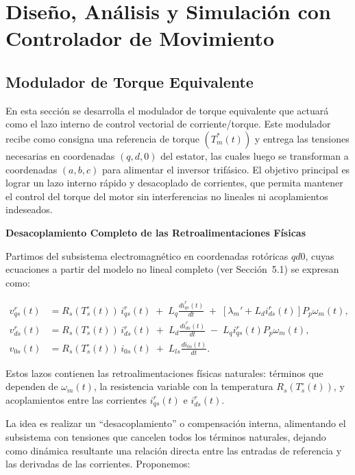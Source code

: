 \documentclass{article}
\begin{document}
\section{Diseño, Análisis y Simulación con Controlador de Movimiento}

\subsection{Modulador de Torque Equivalente}

En esta sección se desarrolla el modulador de torque equivalente que actuará como el lazo interno de control vectorial de corriente/torque. Este modulador recibe como consigna una referencia de torque \((T_m^*(t))\) y entrega las tensiones necesarias en coordenadas \((q,d,0)\) del estator, las cuales luego se transforman a coordenadas \((a,b,c)\) para alimentar el inversor trifásico. El objetivo principal es lograr un lazo interno rápido y desacoplado de corrientes, que permita mantener el control del torque del motor sin interferencias no lineales ni acoplamientos indeseados.

\textbf{Desacoplamiento Completo de las Retroalimentaciones Físicas}

Partimos del subsistema electromagnético en coordenadas rotóricas \( qd0 \), cuyas ecuaciones a partir del modelo no lineal completo (ver Sección~5.1) se expresan como:

\begin{equation}
\begin{aligned}
    v_{qs}^r(t) &= R_s(T_s^\circ(t))\,i_{qs}^r(t) \;+\; L_q \frac{d i_{qs}^r(t)}{dt} \;+\; [\lambda_m' + L_d i_{ds}^r(t)] P_p \omega_m(t),\\[6pt]
    v_{ds}^r(t) &= R_s(T_s^\circ(t))\,i_{ds}^r(t) \;+\; L_d \frac{d i_{ds}^r(t)}{dt} \;-\; L_q i_{qs}^r(t) P_p \omega_m(t),\\[6pt]
    v_{0s}(t) &= R_s(T_s^\circ(t))\,i_{0s}(t) \;+\; L_{ls} \frac{d i_{0s}(t)}{dt}.
\end{aligned}
\end{equation}

Estos lazos contienen las retroalimentaciones físicas naturales: términos que dependen de \(\omega_m(t)\), la resistencia variable con la temperatura \(R_s(T_s^\circ(t))\), y acoplamientos entre las corrientes \(i_{qs}^r(t)\) e \(i_{ds}^r(t)\).

La idea es realizar un “desacoplamiento” o compensación interna, alimentando el subsistema con tensiones que cancelen todos los términos naturales, dejando como dinámica resultante una relación directa entre las entradas de referencia y las derivadas de las corrientes. Proponemos:
\end{document}
